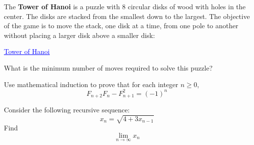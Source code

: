 \documentclass[../mathNotesPreamble]{subfiles}
\begin{document}
  \begin{ex*}
    The \textbf{Tower of Hanoi} is a puzzle with $8$ circular disks of wood with holes in the center. The disks are stacked from the smallest down to the largest. The objective of the game is to move the stack, one disk at a time, from one pole to another without placing a larger disk above a smaller disk:
    \begin{center}
      \href{https://www.mathsisfun.com/games/towerofhanoi.html}{\textcolor{blue}{\underline{Tower of Hanoi}}}
    \end{center}
    What is the minimum number of moves required to solve this puzzle?
  \end{ex*}
  \pagebreak

  \begin{ex*}
    Use mathematical induction to prove that for each integer $n\geq 0$,
      \[F_{n+2}F_n-F_{n+1}^2=(-1)^n\]
  \end{ex*}
  \pagebreak

  \begin{ex*}
    Consider the following recursive sequence:
      \[x_n=\sqrt{4+3x_{n-1}}\]
    Find
      \[\lim_{n\to \infty} x_n\]
  \end{ex*}

  \pagebreak
\end{document}
